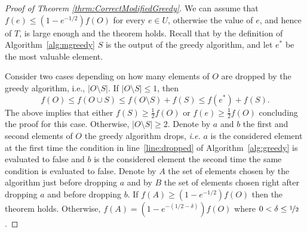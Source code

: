 \documentclass[a4paper,UKenglish,cleveref, autoref]{lipics-v2019}
\newcommand{\SK}{{\textsc{Submodular Knapsack}}\xspace}
\begin{document}

\begin{proof}[Proof of Theorem \ref{thrm:CorrectModifiedGreedy}]
	We can assume that $f(e) \leq (1 - e^{-1/2})f(O)$ for every $e \in U$, otherwise the value of $e$, and hence of $T$, is large enough and the theorem holds.
	Recall that by the definition of Algorithm~\ref{alg:mgreedy} $S$ is the output of the greedy algorithm, and let $e^*$ be the most valuable element.
	
	Consider two cases depending on how many elements of $O$ are dropped by the greedy algorithm, i.e., $|O \setminus S|$.
	If $|O \setminus S| \leq 1$, then
	$$
	f(O) \leq f(O \cup S) \leq f(O \setminus S) + f(S) \leq f(e^*) + f(S).
	$$
	The above implies that either $f(S) \geq \frac{1}{2}f(O)$ or $f(e) \geq \frac{1}{2}f(O)$ concluding the proof for this case.
	Otherwise, $|O \setminus S| \geq 2$.
	Denote by $a$ and $b$ the first and second elements of $O$ the greedy algorithm drops, {\em i.e.} $a$ is the considered element at the first time the condition in line~\ref{line:dropped} of Algorithm~\ref{alg:greedy} is evaluated to false and $b$ is the considered element the second time the same condition is evaluated to false.
	Denote by $A$ the set of elements chosen by the algorithm just before dropping $a$ and by
	$B$ the set of elements chosen right after dropping $a$ and before dropping $b$.
	If $f(A) \geq (1 - e^{-1/2})f(O)$ then the theorem holds.
	Otherwise, $f(A) = (1 - e^{-(1/2 - \delta)})f(O)$ where $0 < \delta \leq \nicefrac[]{1}{2}$.


\end{proof}
\end{document}
